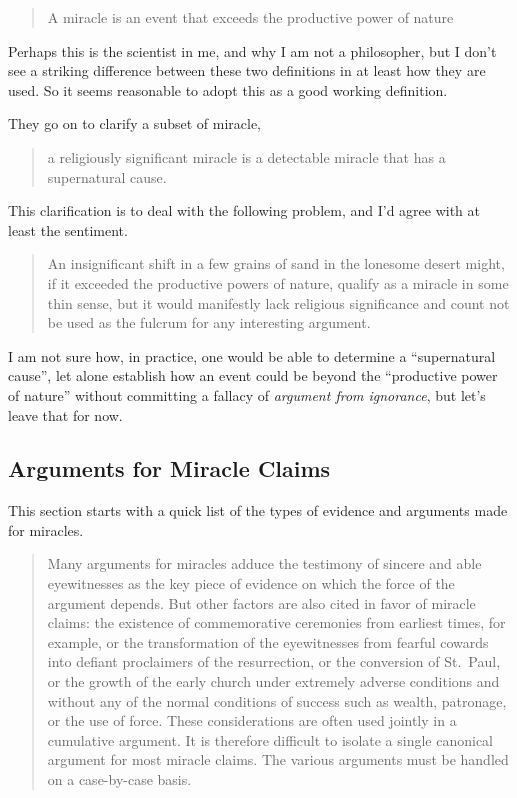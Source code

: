 \begin{quote}
A miracle is an event that exceeds the productive power of nature
\end{quote}

Perhaps this is the scientist in me, and why I am not a philosopher, but
I don't see a striking difference between these two definitions in at
least how they are used. So it seems reasonable to adopt this as a good
working definition.

They go on to clarify a subset of miracle,

\begin{quote}
a religiously significant miracle is a detectable miracle that has a
supernatural cause.
\end{quote}

This clarification is to deal with the following problem, and I'd agree
with at least the sentiment.

\begin{quote}
An insignificant shift in a few grains of sand in the lonesome desert
might, if it exceeded the productive powers of nature, qualify as a
miracle in some thin sense, but it would manifestly lack religious
significance and count not be used as the fulcrum for any interesting
argument.
\end{quote}

I am not sure how, in practice, one would be able to determine a
``supernatural cause'', let alone establish how an event could be beyond
the ``productive power of nature'' without committing a fallacy of
\emph{argument from ignorance}, but let's leave that for now.

\subsection{Arguments for Miracle
Claims}\label{arguments-for-miracle-claims}

This section starts with a quick list of the types of evidence and
arguments made for miracles.

\begin{quote}
Many arguments for miracles adduce the testimony of sincere and able
eyewitnesses as the key piece of evidence on which the force of the
argument depends. But other factors are also cited in favor of miracle
claims: the existence of commemorative ceremonies from earliest times,
for example, or the transformation of the eyewitnesses from fearful
cowards into defiant proclaimers of the resurrection, or the conversion
of St.~Paul, or the growth of the early church under extremely adverse
conditions and without any of the normal conditions of success such as
wealth, patronage, or the use of force. These considerations are often
used jointly in a cumulative argument. It is therefore difficult to
isolate a single canonical argument for most miracle claims. The various
arguments must be handled on a case-by-case basis.
\end{quote}

